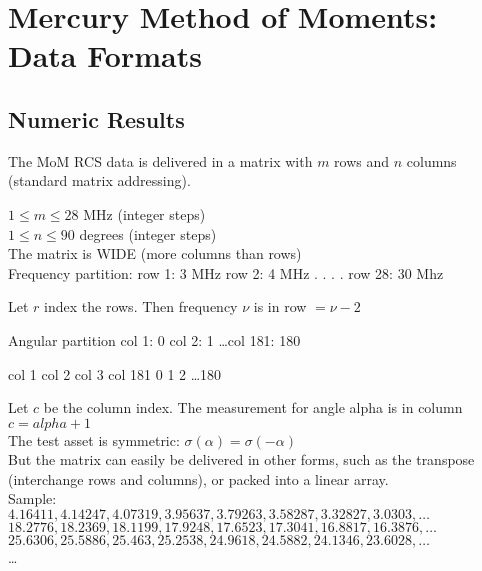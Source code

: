 % 

\section{Mercury Method of Moments: Data Formats}

\subsection{Numeric Results}
The MoM RCS data is delivered in a matrix with $m$ rows and $n$ columns (standard matrix addressing).

$1 \le m \le 28$ MHz (integer steps) \\
$1 \le n \le 90$ degrees (integer steps) \\

The matrix is WIDE (more columns than rows) \\

Frequency partition:
row 1: 3 MHz
row 2: 4 MHz
 .  .  .  .
row 28: 30 Mhz

Let $r$ index the rows. Then frequency $\nu$ is in row $= \nu -2$

Angular partition
col 1: 0  col 2: 1 \dots col 181: 180

col 1   col 2   col 3       col 181
  0       1       2    \dots    180

Let $c$ be the column index. The measurement for angle alpha is in column $c = alpha + 1$\\

The test asset is symmetric: $\sigma(\alpha) = \sigma(-\alpha)$ \\

But the matrix can easily be delivered in other forms, such as the transpose (interchange rows and columns), or packed into a linear array.\\


Sample:\\

$4.16411, 4.14247, 4.07319, 3.95637, 3.79263, 3.58287, 3.32827, 3.0303, \dots$\\
$18.2776, 18.2369, 18.1199, 17.9248, 17.6523, 17.3041, 16.8817, 16.3876, \dots$\\
$25.6306, 25.5886, 25.463, 25.2538, 24.9618, 24.5882, 24.1346, 23.6028, \dots$\\
\dots\\
	

\endinput  %
